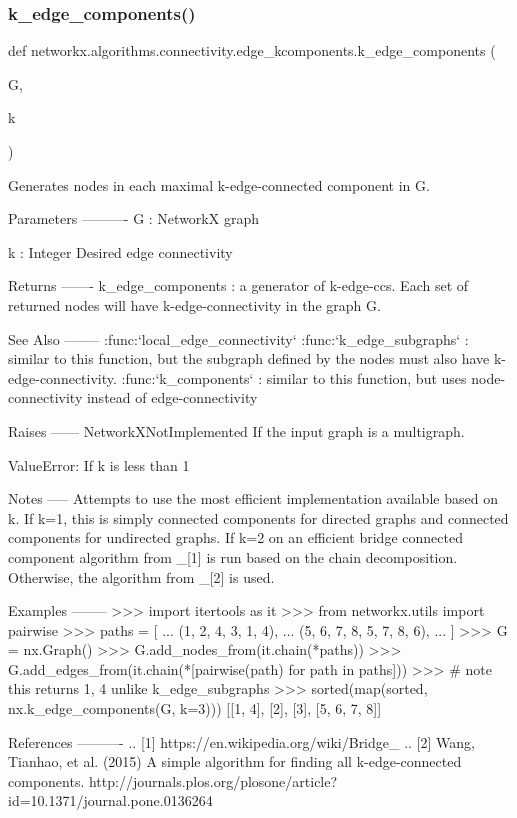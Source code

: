 \subsubsection{\texorpdfstring{k\+\_\+edge\+\_\+components()}{k\_edge\_components()}}
{\footnotesize\ttfamily def networkx.\+algorithms.\+connectivity.\+edge\+\_\+kcomponents.\+k\+\_\+edge\+\_\+components (\begin{DoxyParamCaption}\item[{}]{G,  }\item[{}]{k }\end{DoxyParamCaption})}

\begin{DoxyVerb}Generates nodes in each maximal k-edge-connected component in G.

Parameters
----------
G : NetworkX graph

k : Integer
    Desired edge connectivity

Returns
-------
k_edge_components : a generator of k-edge-ccs. Each set of returned nodes
   will have k-edge-connectivity in the graph G.

See Also
--------
:func:`local_edge_connectivity`
:func:`k_edge_subgraphs` : similar to this function, but the subgraph
    defined by the nodes must also have k-edge-connectivity.
:func:`k_components` : similar to this function, but uses node-connectivity
    instead of edge-connectivity

Raises
------
NetworkXNotImplemented
    If the input graph is a multigraph.

ValueError:
    If k is less than 1

Notes
-----
Attempts to use the most efficient implementation available based on k.
If k=1, this is simply connected components for directed graphs and
connected components for undirected graphs.
If k=2 on an efficient bridge connected component algorithm from _[1] is
run based on the chain decomposition.
Otherwise, the algorithm from _[2] is used.

Examples
--------
>>> import itertools as it
>>> from networkx.utils import pairwise
>>> paths = [
...     (1, 2, 4, 3, 1, 4),
...     (5, 6, 7, 8, 5, 7, 8, 6),
... ]
>>> G = nx.Graph()
>>> G.add_nodes_from(it.chain(*paths))
>>> G.add_edges_from(it.chain(*[pairwise(path) for path in paths]))
>>> # note this returns {1, 4} unlike k_edge_subgraphs
>>> sorted(map(sorted, nx.k_edge_components(G, k=3)))
[[1, 4], [2], [3], [5, 6, 7, 8]]

References
----------
.. [1] https://en.wikipedia.org/wiki/Bridge_%
.. [2] Wang, Tianhao, et al. (2015) A simple algorithm for finding all
    k-edge-connected components.
    http://journals.plos.org/plosone/article?id=10.1371/journal.pone.0136264
\end{DoxyVerb}

